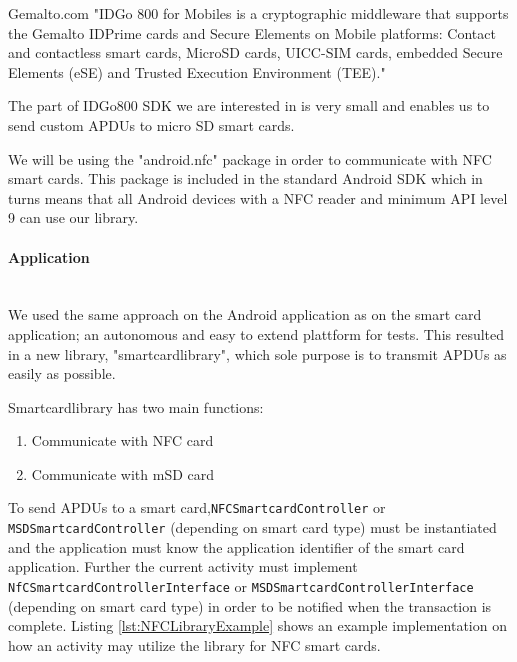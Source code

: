 \begin{aquote}{Gemalto.com \cite{GemaltoIDGo800}}
"IDGo 800 for Mobiles is a cryptographic middleware that supports the Gemalto IDPrime cards and Secure Elements on Mobile platforms: Contact and contactless smart cards, MicroSD cards, UICC-SIM cards, embedded Secure Elements (eSE) and Trusted Execution Environment (TEE)."
\end{aquote}

The part of IDGo800 SDK we are interested in is very small and enables us to send custom APDUs to micro SD smart cards.

We will be using the "android.nfc" package in order to communicate with NFC smart cards. This package is included in the standard Android SDK which in turns means that all Android devices with a NFC reader and minimum API level 9 \cite{androidNFCminSDK} can use our library.

\paragraph{Application}\mbox{}\\
We used the same approach on the Android application as on the smart card application; an autonomous and easy to extend plattform for tests. This resulted in a new library, "smartcardlibrary",  which sole purpose is to transmit APDUs as easily as possible.

Smartcardlibrary has two main functions:
\begin{enumerate}
    \item{Communicate with NFC card}
    \item{Communicate with mSD card}
\end{enumerate}

To send APDUs to a smart card,\texttt{NFCSmartcardController} or\\ \texttt{MSDSmartcardController} (depending on smart card type) must be instantiated and the application must know the application identifier of the smart card application. Further the current activity must implement\\ \texttt{NfCSmartcardControllerInterface} or \texttt{MSDSmartcardControllerInterface} (depending on smart card type) in order to be notified when the transaction is complete. Listing \ref{lst:NFCLibraryExample} shows an example implementation on how an activity may utilize the library for NFC smart cards.

